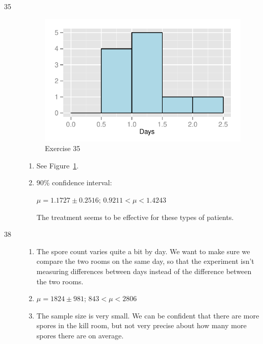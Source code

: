 \documentclass[letterpaper, landscape]{exam}
\begin{document}
\begin{description}
\begin{enumerate}[label = (\alph*)]
        \end{enumerate}

      \item[35]
        \begin{figure}[H]
          \centering
          \includegraphics[scale = 1.0]{figures/ex35.pdf}
          \caption{Exercise 35}\label{fig:ex35}
        \end{figure}

        \begin{enumerate}[label = (\alph*)]
          \item See Figure~\ref{fig:ex35}. 
          \item 90\% confidence interval: 
            
            $\mu = 1.1727 \pm 0.2516$; $0.9211 < \mu < 1.4243$ 

            The treatment seems to be effective for these types of patients.

        \end{enumerate}

      \item[38]
        \begin{enumerate}[label = (\alph*)]
          \item The spore count varies quite a bit by day. We want to make sure
            we compare the two rooms on the same day, so that the experiment
            isn't measuring differences between days instead of the difference
            between the two rooms.

          \item $\mu = 1824 \pm 981$; $843 < \mu < 2806$

          \item The sample size is very small. We can be confident that there
            are more spores in the kill room, but not very precise about how
            many more spores there are on average.


\end{enumerate}
\end{description}
\end{document}
